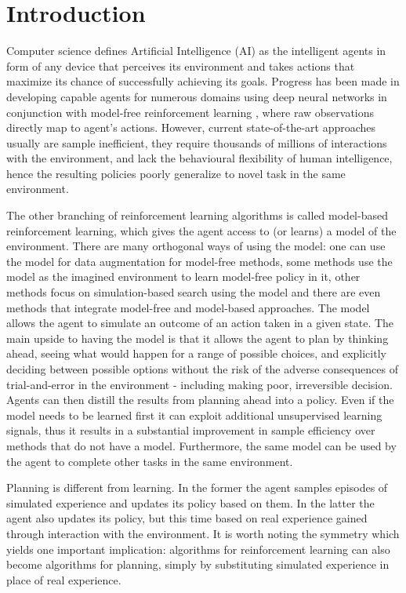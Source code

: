 \section{Introduction}

Computer science defines Artificial Intelligence (AI) as the intelligent agents in form of any device that perceives its environment and takes actions that maximize its chance of successfully achieving its goals. Progress has been made in developing capable agents for numerous domains using deep neural networks in conjunction with model-free reinforcement learning \cite{Algo.Rainbow}\cite{Algo.A3C}\cite{Algo.PPO}, where raw observations directly map to agent's actions. However, current state-of-the-art approaches usually are sample inefficient, they require thousands of millions of interactions with the environment, and lack the behavioural flexibility of human intelligence, hence the resulting policies poorly generalize to novel task in the same environment.

The other branching of reinforcement learning algorithms is called model-based reinforcement learning, which gives the agent access to (or learns) a model of the environment. There are many orthogonal ways of using the model: one can use the model for data augmentation for model-free methods\cite{Algo.MBVE}, some methods use the model as the imagined environment to learn model-free policy in it\cite{Algo.WorldModels}, other methods focus on simulation-based search using the model\cite{Algo.AlphaZero} and there are even methods that integrate model-free and model-based approaches\cite{Algo.I2A}. The model allows the agent to simulate an outcome of an action taken in a given state. The main upside to having the model is that it allows the agent to plan by thinking ahead, seeing what would happen for a range of possible choices, and explicitly deciding between possible options without the risk of the adverse consequences of trial-and-error in the environment - including making poor, irreversible decision. Agents can then distill the results from planning ahead into a policy. Even if the model needs to be learned first it can exploit additional unsupervised learning signals, thus it results in a substantial improvement in sample efficiency over methods that do not have a model. Furthermore, the same model can be used by the agent to complete other tasks in the same environment.

Planning is different from learning. In the former the agent samples episodes of simulated experience and updates its policy based on them. In the latter the agent also updates its policy, but this time based on real experience gained through interaction with the environment. It is worth noting the symmetry which yields one important implication: algorithms for reinforcement learning can also become algorithms for planning, simply by substituting simulated experience in place of real experience.

